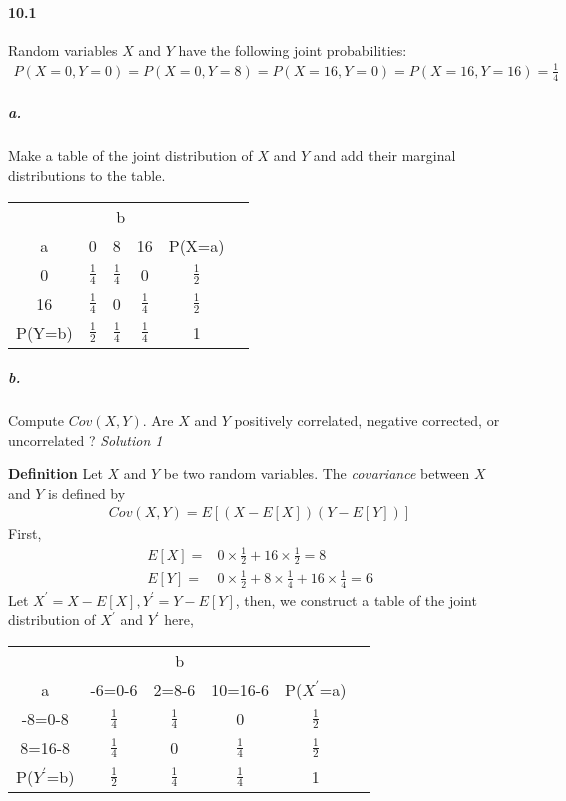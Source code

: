 \documentclass{article} %
\begin{document}
\paragraph*{10.1} Random variables $X$ and $Y$ have the following joint probabilities: 
\begin{align*}
P(X=0,Y=0)=P(X=0,Y=8)=P(X=16,Y=0)=P(X=16,Y=16)=\frac{1}{4}
\end{align*}
\subparagraph*{a.} Make a table of the joint distribution of $X$ and $Y$ and add their marginal distributions to the table.
\begin{table}[h!]
\centering
\renewcommand{\arraystretch}{1.5}
\begin{tabular}{cccccc} \hline \hline 
& \multicolumn{3}{c}{b} \\ \cline{2-4}
a  & 0 & 8 & 16 & P(X=a) \\ \hline
0 & $\frac{1}{4}$ & $\frac{1}{4}$ & 0 & $\frac{1}{2}$ \\ 
16 & $\frac{1}{4}$ & 0 & $\frac{1}{4}$ & $\frac{1}{2}$ \\  \hline
P(Y=b) & $\frac{1}{2}$ & $\frac{1}{4}$ & $\frac{1}{4}$ & 1 \\ \hline \hline
\end{tabular}
\end{table}

\subparagraph*{b.} Compute $Cov(X, Y)$. Are $X$ and $Y$ positively correlated, negative corrected, or uncorrelated ?
{\it Solution 1}

{\bf Definition} Let $X$ and $Y$ be two random variables. The {\it covariance} between $X$ and $Y$ is defined by 
\begin{align*}
Cov(X, Y) = E\left[ \left(X - E[X]\right)\left(Y - E[Y]\right)\right]
\end{align*}
First, 
\begin{align*}
E[X] = & 0 \times \frac{1}{2} + 16 \times \frac{1}{2} = 8 \\
E[Y] = & 0 \times \frac{1}{2} + 8 \times \frac{1}{4} + 16 \times \frac{1}{4} = 6
\end{align*}
Let $X^\prime = X - E[X], Y^\prime = Y - E[Y]$, then, we construct a table of the joint distribution of $X^\prime$ and $Y^\prime$ here,
\begin{table}[h!]
\centering
\renewcommand{\arraystretch}{1.5}
\begin{tabular}{cccccc} \hline \hline
& \multicolumn{3}{c}{b} \\ \cline{2-4} 
a & -6=0-6 & 2=8-6 & 10=16-6 & P($X^\prime$=a) \\ \hline
-8=0-8 & $\frac{1}{4}$ & $\frac{1}{4}$ & 0 & $\frac{1}{2}$ \\ 
8=16-8 & $\frac{1}{4}$ & 0 & $\frac{1}{4}$ & $\frac{1}{2}$ \\  \hline
P($Y^\prime$=b) & $\frac{1}{2}$ & $\frac{1}{4}$ & $\frac{1}{4}$ & 1 \\ \hline \hline
\end{tabular}
\end{table}
\end{document}
